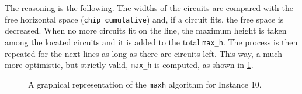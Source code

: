 \documentclass[a4paper, 12pt]{article}
\begin{document}
The reasoning is the following. The widths of the circuits are compared with the free horizontal space (\verb+chip_cumulative+) and, if a circuit fits, the free space is decreased. When no more circuits fit on the line, the maximum height is taken among the located circuits and it is added to the total \verb|max_h|. The process is then repeated for the next lines as long as there are circuits left. This way, a much more optimistic, but strictly valid, \verb|max_h| is computed, as shown in \cref{fig:max_h}.

\begin{figure}
    \centering
    \caption[A graphical representation of the \texttt{maxh} algorithm.]{A graphical representation of the \texttt{maxh} algorithm for Instance 10.}
    \label{fig:max_h}
\end{figure}


\clearpage
\end{document}

